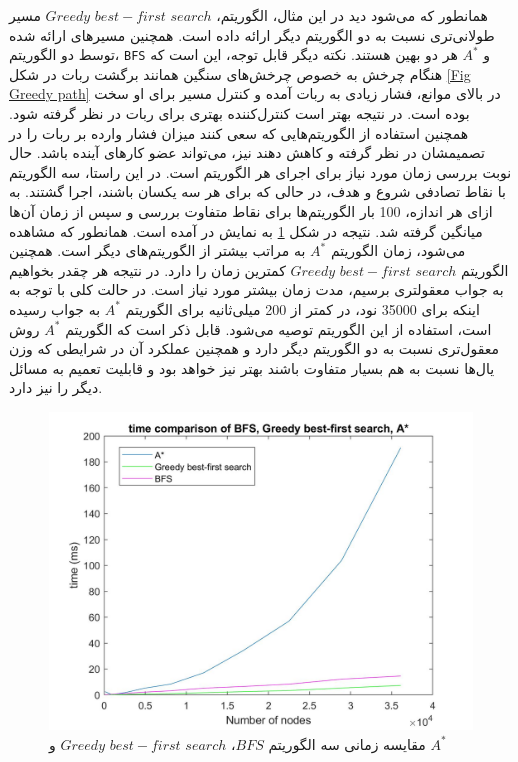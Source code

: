 \newpage
همانطور که می‌شود دید در این مثال، الگوریتم، $search$ $best-first$ $Greedy$ مسیر طولانی‌تری نسبت به دو الگوریتم دیگر ارائه داده است. همچنین مسیرهای ارائه شده توسط دو الگوریتم، \verb|BFS| و $A^*$ هر دو بهین هستند.
\newpage
نکته دیگر قابل توجه، این است که هنگام چرخش به خصوص چرخش‌های سنگین همانند برگشت ربات در شکل \ref{Fig Greedy path} در بالای موانع، فشار زیادی به ربات آمده و کنترل مسیر برای او سخت بوده است. در نتیجه بهتر است کنترل‌کننده بهتری برای ربات در نظر گرفته شود. همچنین استفاده از الگوریتم‌هایی که سعی کنند میزان فشار وارده بر ربات را در تصمیمشان در نظر گرفته و کاهش دهند نیز، می‌تواند عضو کارهای آینده باشد.
\newpage
حال نوبت بررسی زمان مورد نیاز برای اجرای هر الگوریتم است. در این راستا، سه الگوریتم با نقاط تصادفی شروع و هدف، در حالی که برای هر سه یکسان باشند، اجرا گشتند. به ازای هر اندازه، 100 بار الگوریتم‌ها برای نقاط متفاوت بررسی و سپس از زمان آن‌ها میانگین گرفته شد. نتیجه در شکل \ref{Fig heuristic time} به نمایش در آمده است. همانطور که مشاهده می‌شود، زمان الگوریتم $A^*$ به مراتب بیشتر از الگوریتم‌های دیگر است. همچنین الگوریتم $search$ $best-first$ $Greedy$ کمترین زمان را دارد. در نتیجه هر چقدر بخواهیم به جواب معقولتری برسیم، مدت زمان بیشتر مورد نیاز است. در حالت کلی با توجه به اینکه برای 35000 نود، در کمتر از 200 میلی‌ثانیه برای الگوریتم $A^*$ به جواب رسیده است، استفاده از این الگوریتم توصیه می‌شود. قابل ذکر است که الگوریتم $A^*$ روش معقول‌تری نسبت به دو الگوریتم دیگر دارد و همچنین عملکرد آن در شرایطی که وزن‌ یال‌ها نسبت به هم بسیار متفاوت باشند بهتر نیز خواهد بود و قابلیت تعمیم به مسائل دیگر را نیز دارد.

\begin{figure}[!h]
	\centering
	\includegraphics[scale=0.35]{Images/Heuristic time.jpg}
	\caption{مقایسه زمانی سه الگوریتم $BFS$، $search$ $best-first$ $Greedy$ و $A^*$}\label{Fig heuristic time}
\end{figure}





















